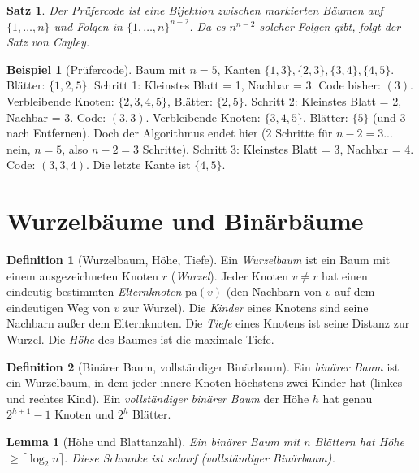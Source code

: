 ﻿\documentclass[a4paper,12pt,openany,oneside]{book}
\theoremstyle{definition}
\newtheorem{definition}{Definition}[chapter]
\newtheorem{beispiel}{Beispiel}[chapter]
\theoremstyle{plain}
\newtheorem{satz}{Satz}[chapter]
\newtheorem{lemma}{Lemma}[chapter]
\theoremstyle{remark}
\begin{document}
\begin{satz}
  Der Pr\"ufercode ist eine Bijektion zwischen markierten B\"aumen auf
  $\{1,\ldots,n\}$ und Folgen in $\{1,\ldots,n\}^{n-2}$. Da es $n^{n-2}$
  solcher Folgen gibt, folgt der Satz von Cayley.
\end{satz}

\begin{beispiel}[Pr\"ufercode]
  Baum mit $n=5$, Kanten $\{1,3\},\{2,3\},\{3,4\},\{4,5\}$.
  Bl\"atter: $\{1,2,5\}$.
  Schritt 1: Kleinstes Blatt = 1, Nachbar = 3. Code bisher: $(3)$.
  Verbleibende Knoten: $\{2,3,4,5\}$, Bl\"atter: $\{2,5\}$.
  Schritt 2: Kleinstes Blatt = 2, Nachbar = 3. Code: $(3,3)$.
  Verbleibende Knoten: $\{3,4,5\}$, Bl\"atter: $\{5\}$ (und 3 nach
  Entfernen). Doch der Algorithmus endet hier (2 Schritte f\"ur $n-2=3$...
  nein, $n=5$, also $n-2=3$ Schritte).
  Schritt 3: Kleinstes Blatt = 3, Nachbar = 4. Code: $(3,3,4)$.
  Die letzte Kante ist $\{4,5\}$. \checkmark
\end{beispiel}

\section{Wurzelb\"aume und Bin\"arb\"aume}

\begin{definition}[Wurzelbaum, H\"ohe, Tiefe]
  Ein \emph{Wurzelbaum} ist ein Baum mit einem ausgezeichneten Knoten $r$
  (\emph{Wurzel}). Jeder Knoten $v \neq r$ hat einen eindeutig bestimmten
  \emph{Elternknoten} $\mathrm{pa}(v)$ (den Nachbarn von $v$ auf dem
  eindeutigen Weg von $v$ zur Wurzel). Die \emph{Kinder} eines Knotens
  sind seine Nachbarn au\ss{}er dem Elternknoten. Die \emph{Tiefe} eines
  Knotens ist seine Distanz zur Wurzel. Die \emph{H\"ohe} des Baumes ist
  die maximale Tiefe.
\end{definition}

\begin{definition}[Bin\"arer Baum, vollst\"andiger Bin\"arbaum]
  Ein \emph{bin\"arer Baum} ist ein Wurzelbaum, in dem jeder innere Knoten
  h\"ochstens zwei Kinder hat (linkes und rechtes Kind). Ein
  \emph{vollst\"andiger bin\"arer Baum} der H\"ohe $h$ hat genau
  $2^{h+1} - 1$ Knoten und $2^h$ Bl\"atter.
\end{definition}

\begin{lemma}[H\"ohe und Blattanzahl]
  Ein bin\"arer Baum mit $n$ Bl\"attern hat H\"ohe $\geq \lceil \log_2 n \rceil$.
  Diese Schranke ist scharf (vollst\"andiger Bin\"arbaum).
\end{lemma}
\end{document}
